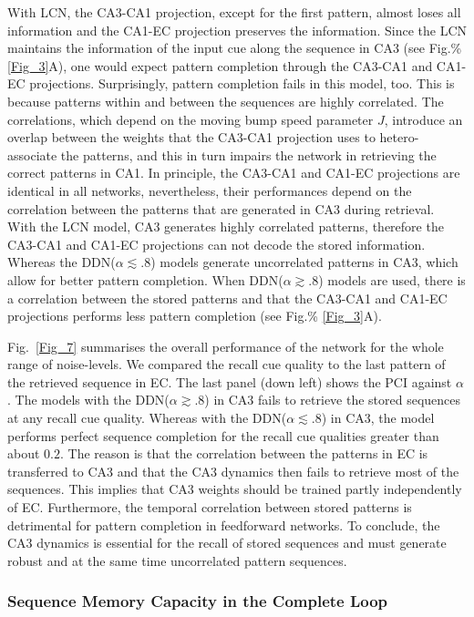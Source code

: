 \documentclass[utf8]{frontiersSCNS} %
\begin{document}
With LCN, the CA3-CA1 projection, except for the first pattern, almost loses all information and the CA1-EC projection preserves the information.
Since the LCN maintains the information of the input cue along the sequence in CA3 (see Fig.\% \ref{Fig_3}A), one would expect pattern completion through the CA3-CA1 and CA1-EC projections. Surprisingly, pattern completion fails in this model, too. This is because patterns within and between the sequences are highly correlated. The correlations, which depend on the moving bump speed parameter $J$, introduce an overlap between the weights that the CA3-CA1 projection uses to hetero-associate the patterns, and this in turn impairs the network in retrieving the correct patterns in CA1.
%
In principle, the CA3-CA1 and CA1-EC projections are identical in all networks, nevertheless, their performances depend on the correlation between the patterns that are generated in CA3 during retrieval. With the LCN model, CA3 generates highly correlated patterns, therefore the CA3-CA1 and CA1-EC projections can not decode the stored information. Whereas the DDN($\alpha \lesssim .8$) models generate uncorrelated patterns in CA3, which allow for better pattern completion. When DDN($\alpha \gtrsim .8$) models are used, there is a correlation between the stored patterns and that the CA3-CA1 and CA1-EC projections performs less pattern completion (see Fig.\% \ref{Fig_3}A).

%
Fig.~\ref{Fig_7} summarises the overall performance of the network for the whole range of noise-levels. We compared the recall cue quality to the last pattern of the retrieved sequence in EC.
%
The last panel (down left) shows the PCI against $\alpha$.
%
The models with the DDN($\alpha \gtrsim .8$) in CA3 fails to retrieve the stored sequences at any recall cue quality. Whereas with the DDN($\alpha \lesssim .8$) in CA3, the model performs perfect sequence completion for the recall cue qualities greater than about $0.2$.
%
The reason is that the correlation between the patterns in EC is transferred to CA3 and that the CA3 dynamics then fails to retrieve most of the sequences. This implies that CA3 weights should be trained partly independently of EC. Furthermore, the temporal correlation between stored patterns is detrimental for pattern completion in feedforward networks. 
To conclude, the CA3 dynamics is essential for the recall of stored sequences and must generate robust and at the same time uncorrelated pattern sequences.          

\subsubsection{Sequence Memory Capacity in the Complete Loop}
\end{document}
